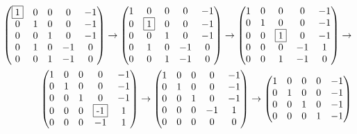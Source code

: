 \documentclass[a4paper, 12pt, oneside]{article}
\begin{document}
\begin{align*}
    \begin{pmatrix}
        \fbox{1} & 0 & 0 & 0 & -1 \\
        0 & 1 & 0 & 0 & -1 \\
        0 & 0 & 1 & 0 & -1 \\
        0 & 1 & 0 & -1 & 0 \\
        0 & 0 & 1 & -1 & 0
    \end{pmatrix} \to
    \begin{pmatrix}
        1 & 0 & 0 & 0 & -1 \\
        0 & \fbox{1} & 0 & 0 & -1 \\
        0 & 0 & 1 & 0 & -1 \\
        0 & 1 & 0 & -1 & 0 \\
        0 & 0 & 1 & -1 & 0
    \end{pmatrix} \to \begin{pmatrix}
        1 & 0 & 0 & 0 & -1 \\
        0 & 1 & 0 & 0 & -1 \\
        0 & 0 & \fbox{1} & 0 & -1 \\
        0 & 0 & 0 & -1 & 1 \\
        0 & 0 & 1 & -1 & 0
    \end{pmatrix} \to \\
    \begin{pmatrix}
        1 & 0 & 0 & 0 & -1 \\
        0 & 1 & 0 & 0 & -1 \\
        0 & 0 & 1 & 0 & -1 \\
        0 & 0 & 0 & \fbox{-1} & 1 \\
        0 & 0 & 0 & -1 & 1
    \end{pmatrix} \to \begin{pmatrix}
        1 & 0 & 0 & 0 & -1 \\
        0 & 1 & 0 & 0 & -1 \\
        0 & 0 & 1 & 0 & -1 \\
        0 & 0 & 0 & -1 & 1 \\
        0 & 0 & 0 & 0 & 0
    \end{pmatrix} \to \begin{pmatrix}
        1 & 0 & 0 & 0 & -1 \\
        0 & 1 & 0 & 0 & -1 \\
        0 & 0 & 1 & 0 & -1 \\
        0 & 0 & 0 & 1 & -1
    \end{pmatrix}
\end{align*}
\end{document}
